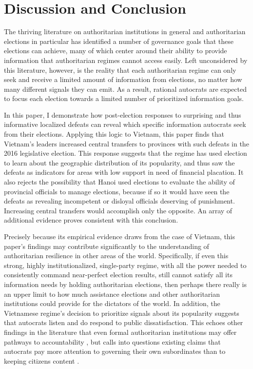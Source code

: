 \documentclass[12pt]{article}
\newcommand{\1}{\mathbbm{1}}
\begin{document}
\section{Discussion and Conclusion}

The thriving literature on authoritarian institutions in general and authoritarian elections in particular has identified a number of governance goals that these elections can achieve, many of which center around their ability to provide information that authoritarian regimes cannot access easily. Left unconsidered by this literature, however, is the reality that each authoritarian regime can only seek and receive a limited amount of information from elections, no matter how many different signals they can emit. As a result, rational autocrats are expected to focus each election towards a limited number of prioritized information goals.

In this paper, I demonstrate how post-election responses to surprising and thus informative localized defeats can reveal which specific information autocrats seek from their elections. Applying this logic to Vietnam, this paper finds that Vietnam's leaders increased central transfers to provinces with such defeats in the 2016 legislative election. This response suggests that the regime has used election to learn about the geographic distribution of its popularity, and thus saw the defeats as indicators for areas with low support in need of financial placation. It also rejects the possibility that Hanoi used elections to evaluate the ability of provincial officials to manage elections, because if so it would have seen the defeats as revealing incompetent or disloyal officials deserving of punishment. Increasing central transfers would accomplish only the opposite. An array of additional evidence proves consistent with this conclusion.

Precisely because its empirical evidence draws from the case of Vietnam, this paper's findings may contribute significantly to the understanding of authoritarian resilience in other areas of the world. Specifically, if even this strong, highly institutionalized, single-party regime, with all the power needed to consistently command near-perfect election results, still cannot satisfy all its information needs by holding authoritarian elections, then perhaps there really is an upper limit to how much assistance elections and other authoritarian institutions could provide for the dictators of the world. In addition, the Vietnamese regime's decision to prioritize signals about its popularity suggests that autocrats listen and do respond to public dissatisfaction. This echoes other findings in the literature that even formal authoritarian institutions may offer pathways to accountability \citep[e.g.][]{Miller2015}, but calls into questions existing claims that autocrats pay more attention to governing their own subordinates than to keeping citizens content \citep[e.g.][]{Svolik2012}.
\end{document}
